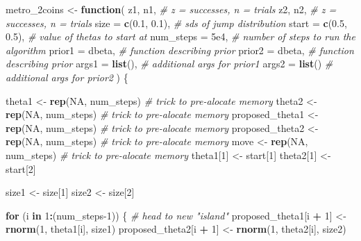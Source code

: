 \documentclass[
  12pt,
]{book}
\newenvironment{Shaded}{\begin{snugshade}}{\end{snugshade}}
\newcommand{\CommentTok}[1]{\textcolor[rgb]{0.56,0.35,0.01}{\textit{#1}}}
\newcommand{\ControlFlowTok}[1]{\textcolor[rgb]{0.13,0.29,0.53}{\textbf{#1}}}
\newcommand{\DataTypeTok}[1]{\textcolor[rgb]{0.13,0.29,0.53}{#1}}
\newcommand{\DecValTok}[1]{\textcolor[rgb]{0.00,0.00,0.81}{#1}}
\newcommand{\FloatTok}[1]{\textcolor[rgb]{0.00,0.00,0.81}{#1}}
\newcommand{\KeywordTok}[1]{\textcolor[rgb]{0.13,0.29,0.53}{\textbf{#1}}}
\newcommand{\NormalTok}[1]{#1}
\newcommand{\OperatorTok}[1]{\textcolor[rgb]{0.81,0.36,0.00}{\textbf{#1}}}
\newcommand{\OtherTok}[1]{\textcolor[rgb]{0.56,0.35,0.01}{#1}}
\newcommand{\StringTok}[1]{\textcolor[rgb]{0.31,0.60,0.02}{#1}}
\theoremstyle{definition}
\theoremstyle{definition}
\theoremstyle{definition}
\theoremstyle{remark}
\begin{document}
\begin{Shaded}
\begin{Highlighting}[]
\NormalTok{metro_2coins <-}\StringTok{ }\ControlFlowTok{function}\NormalTok{(}
\NormalTok{  z1, n1,              }\CommentTok{# z = successes, n = trials}
\NormalTok{  z2, n2,              }\CommentTok{# z = successes, n = trials}
  \DataTypeTok{size  =} \KeywordTok{c}\NormalTok{(}\FloatTok{0.1}\NormalTok{, }\FloatTok{0.1}\NormalTok{), }\CommentTok{# sds of jump distribution}
  \DataTypeTok{start =} \KeywordTok{c}\NormalTok{(}\FloatTok{0.5}\NormalTok{, }\FloatTok{0.5}\NormalTok{), }\CommentTok{# value of thetas to start at}
  \DataTypeTok{num_steps =} \FloatTok{5e4}\NormalTok{,     }\CommentTok{# number of steps to run the algorithm}
  \DataTypeTok{prior1 =}\NormalTok{ dbeta,      }\CommentTok{# function describing prior}
  \DataTypeTok{prior2 =}\NormalTok{ dbeta,      }\CommentTok{# function describing prior}
  \DataTypeTok{args1 =} \KeywordTok{list}\NormalTok{(),      }\CommentTok{# additional args for prior1}
  \DataTypeTok{args2 =} \KeywordTok{list}\NormalTok{()      }\CommentTok{# additional args for prior2}
\NormalTok{  ) \{}
  
\NormalTok{  theta1            <-}\StringTok{ }\KeywordTok{rep}\NormalTok{(}\OtherTok{NA}\NormalTok{, num_steps)  }\CommentTok{# trick to pre-alocate memory}
\NormalTok{  theta2            <-}\StringTok{ }\KeywordTok{rep}\NormalTok{(}\OtherTok{NA}\NormalTok{, num_steps)  }\CommentTok{# trick to pre-alocate memory}
\NormalTok{  proposed_theta1   <-}\StringTok{ }\KeywordTok{rep}\NormalTok{(}\OtherTok{NA}\NormalTok{, num_steps)  }\CommentTok{# trick to pre-alocate memory}
\NormalTok{  proposed_theta2   <-}\StringTok{ }\KeywordTok{rep}\NormalTok{(}\OtherTok{NA}\NormalTok{, num_steps)  }\CommentTok{# trick to pre-alocate memory}
\NormalTok{  move              <-}\StringTok{ }\KeywordTok{rep}\NormalTok{(}\OtherTok{NA}\NormalTok{, num_steps)  }\CommentTok{# trick to pre-alocate memory}
\NormalTok{  theta1[}\DecValTok{1}\NormalTok{]         <-}\StringTok{ }\NormalTok{start[}\DecValTok{1}\NormalTok{]}
\NormalTok{  theta2[}\DecValTok{1}\NormalTok{]         <-}\StringTok{ }\NormalTok{start[}\DecValTok{2}\NormalTok{]}

\NormalTok{  size1 <-}\StringTok{ }\NormalTok{size[}\DecValTok{1}\NormalTok{] }
\NormalTok{  size2 <-}\StringTok{ }\NormalTok{size[}\DecValTok{2}\NormalTok{] }
  
  \ControlFlowTok{for}\NormalTok{ (i }\ControlFlowTok{in} \DecValTok{1}\OperatorTok{:}\NormalTok{(num_steps}\DecValTok{-1}\NormalTok{)) \{}
    \CommentTok{# head to new "island"}
\NormalTok{    proposed_theta1[i }\OperatorTok{+}\StringTok{ }\DecValTok{1}\NormalTok{] <-}\StringTok{ }\KeywordTok{rnorm}\NormalTok{(}\DecValTok{1}\NormalTok{, theta1[i], size1)}
\NormalTok{    proposed_theta2[i }\OperatorTok{+}\StringTok{ }\DecValTok{1}\NormalTok{] <-}\StringTok{ }\KeywordTok{rnorm}\NormalTok{(}\DecValTok{1}\NormalTok{, theta2[i], size2)}
    

\end{Highlighting}
\end{Shaded}
\end{document}
